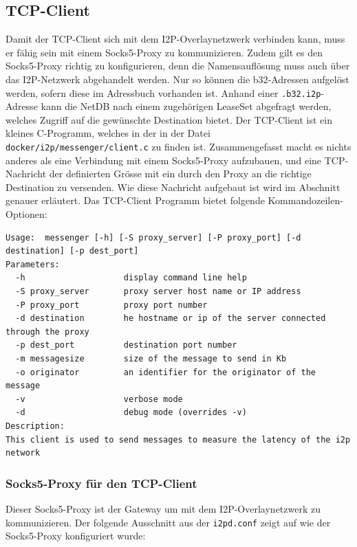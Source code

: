 \subsection{TCP-Client}\label{sec:tcpclient}

Damit der TCP-Client sich mit dem I2P-Overlaynetzwerk verbinden kann, muss er fähig sein mit einem Socks5-Proxy zu kommunizieren.
Zudem gilt es den Socks5-Proxy richtig zu konfigurieren,
denn die Namensauflösung muss auch über das I2P-Netzwerk abgehandelt werden.
Nur so können die b32-Adressen aufgelöst werden, sofern diese im Adressbuch vorhanden ist.
Anhand einer \lstinline|.b32.i2p|-Adresse kann die NetDB nach einem zugehörigen LeaseSet abgefragt werden, welches Zugriff auf die gewünschte Destination bietet.
Der TCP-Client ist ein kleines C-Programm, welches in der 
in der Datei \lstinline|docker/i2p/messenger/client.c| zu finden ist.
Zusammengefasst macht es nichts anderes als
eine Verbindung mit einem Socks5-Proxy aufzubauen, und eine TCP-Nachricht der definierten Grösse mit ein durch den Proxy an die richtige Destination zu versenden.
Wie diese Nachricht aufgebaut ist wird im Abschnitt~ genauer erläutert.
Das TCP-Client Programm bietet folgende Kommandozeilen-Optionen:

\begin{lstlisting}
Usage:  messenger [-h] [-S proxy_server] [-P proxy_port] [-d destination] [-p dest_port]
Parameters:
  -h                    display command line help
  -S proxy_server       proxy server host name or IP address
  -P proxy_port         proxy port number
  -d destination        he hostname or ip of the server connected through the proxy
  -p dest_port          destination port number
  -m messagesize        size of the message to send in Kb
  -o originator         an identifier for the originator of the message
  -v                    verbose mode
  -d                    debug mode (overrides -v)
Description:
This client is used to send messages to measure the latency of the i2p network
\end{lstlisting}

\subsubsection{Socks5-Proxy für den TCP-Client}

Dieser Socks5-Proxy ist der Gateway um mit dem I2P-Overlaynetzwerk zu kommunizieren.
Der folgende Ausschnitt aus der \lstinline|i2pd.conf| zeigt auf wie der Socks5-Proxy konfiguriert wurde:

